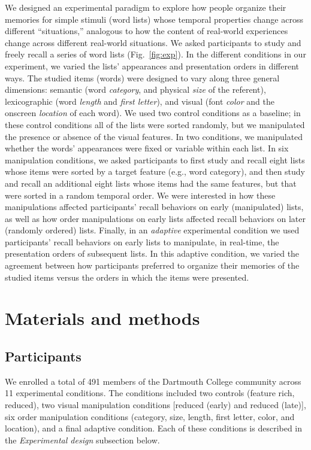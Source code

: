 \documentclass[11pt]{article}
\begin{document}
We designed an experimental paradigm to explore how people organize their
memories for simple stimuli (word lists) whose temporal properties change
across different ``situations,'' analogous to how the content of real-world
experiences change across different real-world situations. We asked
participants to study and freely recall a series of word lists
(Fig.~\ref{fig:exp}). In the different conditions in our experiment, we varied
the lists' appearances and presentation orders in different ways. The studied
items (words) were designed to vary along three general dimensions: semantic
(word \textit{category}, and physical \textit{size} of the referent),
lexicographic (word \textit{length} and \textit{first letter}), and visual
(font \textit{color} and the onscreen \textit{location} of each word). We used
two control conditions as a baseline; in these control conditions all of the
lists were sorted randomly, but we manipulated the presence or absence of the
visual features. In two conditions, we manipulated whether the words'
appearances were fixed or variable within each list. In six manipulation
conditions, we asked participants to first study and recall eight lists whose
items were sorted by a target feature (e.g., word category), and then study and
recall an additional eight lists whose items had the same features, but that
were sorted in a random temporal order. We were interested in how these
manipulations affected participants' recall behaviors on early (manipulated)
lists, as well as how order manipulations on early lists affected recall
behaviors on later (randomly ordered) lists. Finally, in an \textit{adaptive}
experimental condition we used participants' recall behaviors on early lists to
manipulate, in real-time, the presentation orders of subsequent lists. In this
adaptive condition, we varied the agreement between how participants preferred
to organize their memories of the studied items versus the orders in which the
items were presented.

\section*{Materials and methods}

\subsection*{Participants}

We enrolled a total of 491 members of the Dartmouth College community across 11
experimental conditions. The conditions included two controls (feature rich,
reduced), two visual manipulation conditions [reduced (early) and reduced
(late)], six order manipulation conditions (category, size, length, first
letter, color, and location), and a final adaptive condition. Each of these
conditions is described in the \textit{Experimental design} subsection below.
\end{document}
